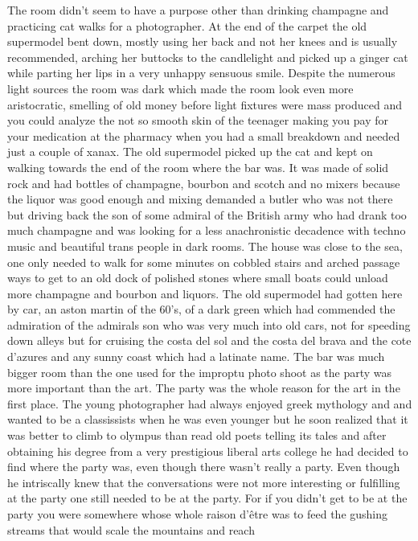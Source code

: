 The room didn’t seem to have a purpose other than drinking champagne and
practicing cat walks for a photographer. At the end of the carpet the old
supermodel bent down, mostly using her back and not her knees and is usually
recommended, arching her buttocks to the candlelight and picked up a ginger cat
while parting her lips in a very unhappy sensuous smile.  Despite the numerous
light sources the room was dark which made the room look even more
aristocratic, smelling of old money before light fixtures were mass produced
and you could analyze the not so smooth skin of the teenager making you pay for
your medication at the pharmacy when you had a small breakdown and needed just
a couple of xanax. The old supermodel picked up the cat and kept on walking
towards the end of the room where the bar was. It was made of solid rock and
had bottles of champagne, bourbon and scotch and no mixers because the liquor
was good enough and mixing demanded a butler who was not there but driving back
the son of some admiral of the British army who had drank too much champagne
and was looking for a less anachronistic decadence with techno music and
beautiful trans people in dark rooms. The house was close to the sea, one only
needed to walk for some minutes on cobbled stairs and arched passage ways to
get to an old dock of polished stones where small boats could unload more
champagne and bourbon and liquors. The old supermodel had gotten here by car,
an aston martin of the 60’s, of a dark green which had commended the admiration
of the admirals son who was very much into old cars, not for speeding down
alleys but for cruising the costa del sol and the costa del brava and the cote
d’azures and any sunny coast which had a latinate name. The bar was much bigger
room than the one used for the improptu photo shoot as the party was more
important than the art. The party was the whole reason for the art in the first
place. The young photographer had always enjoyed greek mythology and and wanted
to be a classissists when he was even younger but he soon realized that it was
better to climb to olympus than read old poets telling its tales and after
obtaining his degree from a very prestigious liberal arts college he had
decided to find where the party was, even though there wasn’t really a party.
Even though he intriscally knew that the conversations were not more
interesting or fulfilling at the party one still needed to be at the party. For
if you didn’t get to be at the party you were somewhere whose whole raison
d’être was to feed the gushing streams that would scale the mountains and reach
